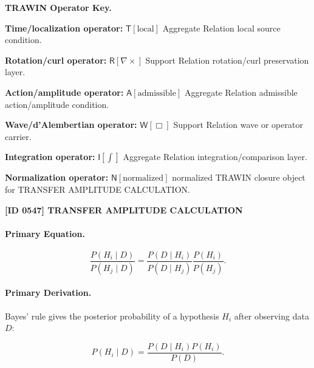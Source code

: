 \par\vspace{0.45\baselineskip}
\noindent\begin{minipage}[t]{\linewidth}
\begingroup
\small
\raggedright
\textbf{TRAWIN Operator Key.}\par
\noindent\textbf{Time/localization operator:} $\mathsf{T}\!\left[\mathrm{local}\right]$ Aggregate Relation local source condition.\par
\noindent\textbf{Rotation/curl operator:} $\mathsf{R}\!\left[\nabla\times\right]$ Support Relation rotation/curl preservation layer.\par
\noindent\textbf{Action/amplitude operator:} $\mathsf{A}\!\left[\mathrm{admissible}\right]$ Aggregate Relation admissible action/amplitude condition.\par
\noindent\textbf{Wave/d'Alembertian operator:} $\mathsf{W}\!\left[\Box\right]$ Support Relation wave or operator carrier.\par
\noindent\textbf{Integration operator:} $\mathsf{I}\!\left[\int\right]$ Aggregate Relation integration/comparison layer.\par
\noindent\textbf{Normalization operator:} $\mathsf{N}\!\left[\mathrm{normalized}\right]$ normalized TRAWIN closure object for TRANSFER AMPLITUDE CALCULATION.\par
\endgroup
\end{minipage}

\clearpage
\noindent\textbf{[ID 0547] TRANSFER AMPLITUDE CALCULATION}\par
\vspace{0.35em}
\paragraph{Primary Equation.}
\begin{equation}
\frac{P(H_i\mid D)}
{P(H_j\mid D)}
=
\frac{P(D\mid H_i)}
{P(D\mid H_j)}
\frac{P(H_i)}
{P(H_j)} .
\end{equation}

\paragraph{Primary Derivation.}
Bayes' rule gives the posterior probability of a hypothesis $H_i$ after observing data $D$:

\begin{equation}
P(H_i\mid D)
=
\frac{P(D\mid H_i)P(H_i)}
{P(D)} .
\end{equation}

